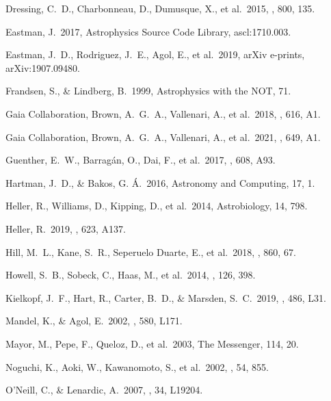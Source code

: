  Dressing, C.~D., Charbonneau, D., Dumusque, X., et al.\ 2015, \apj, 800, 135.

 Eastman, J.\ 2017, Astrophysics Source Code Library, ascl:1710.003.

 Eastman, J.~D., Rodriguez, J.~E., Agol, E., et al.\ 2019, arXiv e-prints, arXiv:1907.09480.

 Frandsen, S., \& Lindberg, B.\ 1999, Astrophysics with the NOT, 71.

 Gaia Collaboration, Brown, A.~G.~A., Vallenari, A., et al.\ 2018, \aap, 616, A1.

 Gaia Collaboration, Brown, A.~G.~A., Vallenari, A., et al.\ 2021, \aap, 649, A1.

 Guenther, E.~W., Barrag{\'a}n, O., Dai, F., et al.\ 2017, \aap, 608, A93.

 Hartman, J.~D., \& Bakos, G. {\'A}.\ 2016, Astronomy and Computing, 17, 1.

 Heller, R., Williams, D., Kipping, D., et al.\ 2014, Astrobiology, 14, 798.

 Heller, R.\ 2019, \aap, 623, A137.

 Hill, M.~L., Kane, S.~R., Seperuelo Duarte, E., et al.\ 2018, \apj, 860, 67.

 Howell, S.~B., Sobeck, C., Haas, M., et al.\ 2014, \pasp, 126, 398.

 Kielkopf, J.~F., Hart, R., Carter, B.~D., \& Marsden, S.~C.\ 2019, \mnras, 486, L31.

 Mandel, K., \& Agol, E.\ 2002, \apjl, 580, L171.

 Mayor, M., Pepe, F., Queloz, D., et al.\ 2003, The Messenger, 114, 20.

 Noguchi, K., Aoki, W., Kawanomoto, S., et al.\ 2002, \pasj, 54, 855.

 O'Neill, C., \& Lenardic, A.\ 2007, \grl, 34, L19204.

